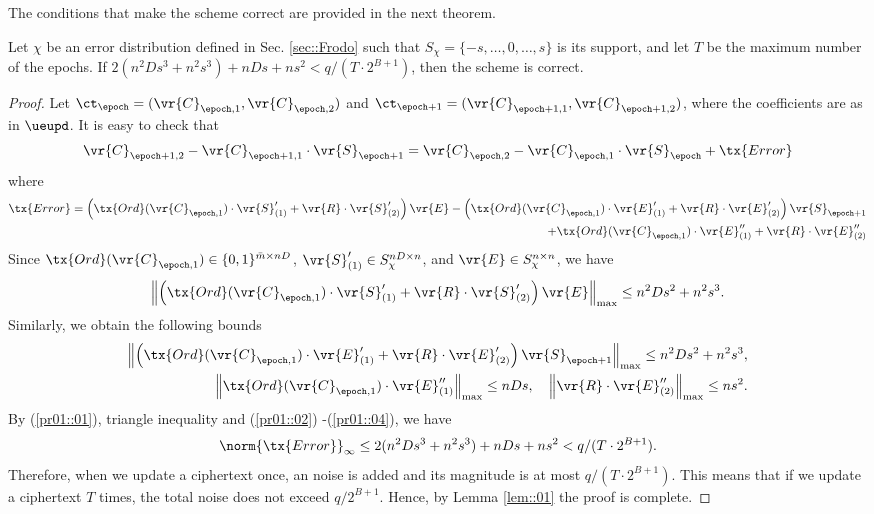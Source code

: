 \documentclass{fundam}
\begin{document}
The conditions that make the scheme correct are provided in the next theorem. 
\begin{theorem}
	Let $\chi$ be an error distribution defined in Sec. \ref{sec::Frodo} such that $S_{\chi}=\{ -s, \ldots, 0,  \ldots ,s \}$ is its support, and
	let $T$ be the maximum number of the epochs. If $2(n^{2}Ds^{3}+n^{2}s^{3})+nDs + ns^{2}<q/(T\cdot 2^{B+1})$, then the scheme is correct.
\end{theorem}	


\begin{proof}
Let $\ct_{\epoch} =  (\vr{C}_{\epoch,1}, \vr{C}_{\epoch, 2})$ and $\ct_{\epoch+1} =  (\vr{C}_{\epoch+1,1}, \vr{C}_{\epoch+1, 2})$, where the coefficients are as in $\ueupd$. It is easy to check that 
 \begin{align*}
	\vr{C}_{\epoch+1,2} - \vr{C}_{\epoch +1, 1}\cdot \vr{S}_{\epoch +1} = \vr{C}_{\epoch,2} - \vr{C}_{\epoch , 1}\cdot \vr{S}_{\epoch } + \tx{Error}
\end{align*}
where
\begin{align}\label{pr01::01}
	\tx{Error}= \left(\tx{Ord}(\vr{C}_{\epoch , 1})\cdot\vr{S}_{(1)}' + \vr{R}\cdot \vr{S}_{(2)}'\right)\vr{E}- \left(\tx{Ord}(\vr{C}_{\epoch , 1})\cdot\vr{E}_{(1)}' + \vr{R}\cdot \vr{E}_{(2)}'\right)\vr{S}_{\epoch+1} \\
	+ \tx{Ord}(\vr{C}_{\epoch , 1})\cdot\vr{E}_{(1)}'' + \vr{R}\cdot \vr{E}_{(2)}'' \nonumber
\end{align}
Since $\tx{Ord}(\vr{C}_{\epoch , 1})\in\{0,1\}^{\bar{m}\times nD}$, $\vr{S}_{(1)}' \in S_{\chi}^{nD\times n}$, and $\vr{E} \in S_{\chi}^{n\times n}$, we have
\begin{align}\label{pr01::02}
	\left\|  \left(\tx{Ord}(\vr{C}_{\epoch , 1})\cdot\vr{S}_{(1)}' + \vr{R}\cdot \vr{S}_{(2)}'\right)\vr{E} \right\|_{\max}\leq n^{2}Ds^{2}+n^{2}s^{3}.
\end{align}
Similarly, we obtain the following bounds
\begin{align}
	\left\|  \left(\tx{Ord}(\vr{C}_{\epoch , 1})\cdot\vr{E}_{(1)}' + \vr{R}\cdot \vr{E}_{(2)}'\right)\vr{S}_{\epoch+1}    \right\|_{\max}\leq n^{2}Ds^{2}+n^{2}s^{3}, \label{pr01::03}\\
		\left\|  \tx{Ord}(\vr{C}_{\epoch , 1})\cdot\vr{E}_{(1)}'' \right\|_{\max}\leq nDs, ~~~ \left\|  \vr{R}\cdot \vr{E}_{(2)}'' \right\|_{\max}\leq ns^{2}. \label{pr01::04}
\end{align}
By (\ref{pr01::01}), triangle inequality and (\ref{pr01::02}) -(\ref{pr01::04}), we have
\begin{align*}
	\norm{\tx{Error}}_{\infty}\leq 2(n^{2}Ds^{3}+n^{2}s^{3})+nDs + ns^{2}<q/(T\cdot 2^{B+1}).
\end{align*}
Therefore, when we update a ciphertext once, an noise is added and its magnitude is at most $q/(T\cdot 2^{B+1})$. This means that if we update a ciphertext $T$ times, the total noise does not exceed $q/2^{B+1}$. Hence, by Lemma \ref{lem::01} the proof is complete.
\end{proof}	
\end{document}
